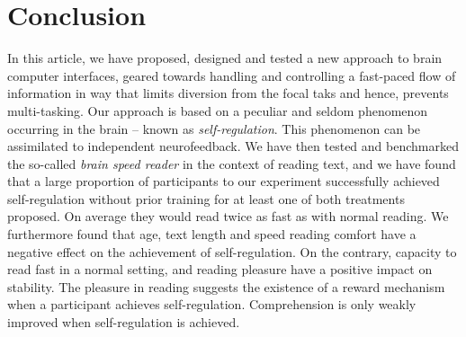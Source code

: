 \section{Conclusion}
\label{conclusion}

In this article, we have proposed, designed and tested a new approach to brain computer interfaces, geared towards handling and controlling a fast-paced flow of information in way that limits diversion from the focal taks and hence, prevents multi-tasking. Our approach is based on a peculiar and seldom phenomenon occurring in the brain -- known as {\it self-regulation}. This phenomenon can be assimilated to independent neurofeedback. We have then tested and benchmarked the so-called {\it brain speed reader} in the context of reading text, and we have found that a large proportion of participants to our experiment successfully achieved self-regulation without prior training for at least one of both treatments proposed. On average they would read twice as fast as with normal reading. We furthermore found that age, text length and speed reading comfort have a negative effect on the achievement of self-regulation. On the contrary, capacity to read fast in a normal setting, and reading pleasure have a positive impact on stability. The pleasure in reading suggests the existence of a reward mechanism when a participant achieves self-regulation. Comprehension is only weakly improved when self-regulation is achieved. 

